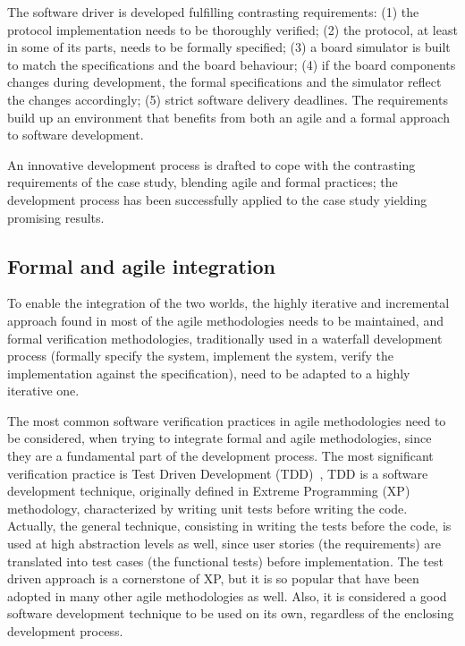 \documentclass[english]{lni}
\begin{document}
The software driver is developed fulfilling contrasting requirements: (1) the protocol implementation needs to be thoroughly verified; (2) the protocol, at least in some of its parts, needs to be formally specified; (3) a board simulator is built to match the specifications and the board behaviour; (4) if the board components changes during development, the formal specifications and the simulator reflect the changes accordingly; (5) strict software delivery deadlines. 
The requirements build up an environment that benefits from both an agile and a formal approach to software development.

An innovative development process is drafted to cope with the contrasting requirements of the case study, blending agile and formal practices; the development process has been successfully applied to the case study yielding promising results. 



\subsection{Formal and agile integration}
\label{subsec:formal_and_agile_integration}

To enable the integration of the two worlds, the highly iterative and incremental approach found in most of the agile methodologies needs to be maintained, and formal verification  methodologies, traditionally used in a waterfall development process (formally specify the system, implement the system, verify the implementation against the specification), need to be adapted to a highly iterative one.

The most common software verification practices in agile methodologies need to be considered, when trying to integrate formal and agile methodologies, since they are a fundamental part of the development process. 
The most significant verification practice is Test Driven Development (TDD)~\cite{Beck2003}, TDD is a software development technique, originally defined in Extreme Programming (XP)~\cite{Beck2004} methodology, characterized by writing unit tests before writing the code.
Actually, the general technique, consisting in writing the tests before the code, is used at high abstraction levels as well, since user stories (the requirements) are translated into test cases (the functional tests) before implementation.
The test driven approach is a cornerstone of XP, but it is so popular that have been adopted in many other agile methodologies as well.
Also, it is considered a good software development technique to be used on its own, regardless of the enclosing development process.
\end{document}
